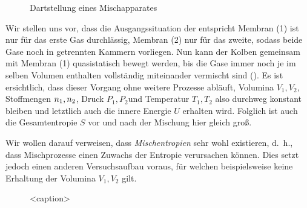 \begin{figure}[htbp]
    \centering
    \begin{subfigure}[b]{.45\textwidth}
        \centering
        \tfigMixingMachineOne        
        \caption{}
        \label{fig:MixingMachineOne}
    \end{subfigure}
    \begin{subfigure}[b]{.45\textwidth}
        \centering
        \tfigMixingMachineTwo           
        \caption{}
        \label{fig:MixingMachineTwo}
    \end{subfigure}
    \caption{Dartstellung eines Mischapparates}
    \label{fig:MixingMaschine}
\end{figure}
Wir stellen uns vor, dass die Ausgangssituation der  entspricht \textendash{} Membran (1) ist nur für das erste Gas durchlässig, Membran (2) nur für das zweite, sodass beide Gase noch in getrennten Kammern vorliegen. Nun kann der Kolben gemeinsam mit
Membran (1) quasistatisch%
bewegt werden, bis die Gase \textendash{} immer noch je im selben Volumen enthalten \textendash{} vollständig miteinander vermischt sind (). Es ist ersichtlich, dass dieser Vorgang ohne weitere Prozesse abläuft, Volumina $V_1,V_2$, Stoffmengen $n _1,n _2$, Druck $P_1,P_2$und Temperatur $T_1,T_2$ also durchweg konstant bleiben und letztlich auch die innere Energie $U$ erhalten wird. Folglich ist auch die Gesamtentropie $S$ vor und nach der Mischung hier gleich groß.

Wir wollen darauf verweisen, dass \emph{Mischentropien} sehr wohl existieren, d.~h., dass Mischprozesse einen Zuwachs der Entropie verursachen können. Dies setzt jedoch einen anderen Versuchsaufbau voraus, für welchen beispielsweise keine Erhaltung der Volumina $V_1,V_2$ gilt. 
\begin{figure}[htbp]
    \centering
    \tfigMixTwoGases
    \caption{<caption>}
    \label{fig:MixTwoGases}
\end{figure}

